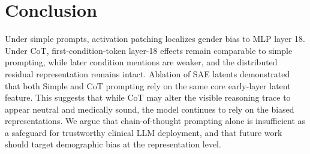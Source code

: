 \documentclass{article}
\begin{document}
\section{Conclusion}
Under simple prompts, activation patching localizes gender bias to MLP layer 18. Under CoT, first-condition-token layer-18 effects remain comparable to simple prompting, while later condition mentions are weaker, and the distributed residual representation remains intact. Ablation of SAE latents demonstrated that both Simple and CoT prompting rely on the same core early-layer latent feature. This suggests that while CoT may alter the visible reasoning trace to appear neutral and medically sound, the model continues to rely on the biased representations. We argue that chain-of-thought prompting alone is insufficient as a safeguard for trustworthy clinical LLM deployment, and that future work should target demographic bias at the representation level.
\end{document}
